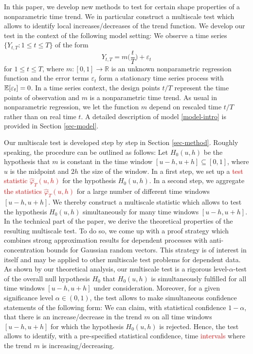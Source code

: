In this paper, we develop new methods to test for certain shape properties of a nonparametric time trend. We in particular construct a multiscale test which allows to identify local increases/decreases of the trend function. 
We develop our test in the context of the following model setting: We observe a time series $\{ Y_{t,T}: 1 \le t \le T \}$ of the form 
\begin{equation}\label{model-intro}
Y_{t,T} = m \Big( \frac{t}{T} \Big) + \varepsilon_t
\end{equation}
for $1 \le t \le T$, where $m: [0,1] \rightarrow \mathbb{R}$ is an unknown nonparametric regression function and the error terms $\varepsilon_t$ form a stationary time series process with $\mathbb{E}[\varepsilon_t] = 0$. In a time series context, the design points $t/T$ represent the time points of observation and $m$ is a nonparametric time trend. As usual in nonparametric regression, we let the function $m$ depend on rescaled time $t/T$ rather than on real time $t$. A detailed description of model \eqref{model-intro} is provided in Section \ref{sec-model}.


Our multiscale test is developed step by step in Section \ref{sec-method}. Roughly speaking, the procedure can be outlined as follows: Let $H_0(u,h)$ be the hypothesis that $m$ is constant in the time window $[u-h,u+h] \subseteq [0,1]$, where $u$ is the midpoint and $2h$ the size of the window. In a first step, we set up a \textcolor{red}{test statistic $\widehat{\varphi}_T(u,h)$} for the hypothesis $H_0(u,h)$. In a second step, we aggregate \textcolor{red}{the statistics $\widehat{\varphi}_T(u,h)$} for a large number of different time windows $[u-h,u+h]$. We thereby construct a multiscale statistic which allows to test the hypothesis $H_0(u,h)$ simultaneously for many time windows $[u-h,u+h]$. In the technical part of the paper, we derive the theoretical properties of the resulting multiscale test. To do so, we come up with a proof strategy which combines strong approximation results for dependent processes with anti-concentration bounds for Gaussian random vectors. This strategy is of interest in itself and may be applied to other multiscale test problems for dependent data. As shown by our theoretical analysis, our multiscale test is a rigorous level-$\alpha$-test of the overall null hypothesis $H_0$ that $H_0(u,h)$ is simultaneously fulfilled for all time windows $[u-h,u+h]$ under consideration. Moreover, for a given significance level $\alpha \in (0,1)$, the test allows to make simultaneous confidence statements of the following form: We can claim, with statistical confidence $1-\alpha$, that there is an increase/decrease in the trend $m$ on all time windows $[u-h,u+h]$ for which the hypothesis $H_0(u,h)$ is rejected. Hence, the test allows to identify, with a pre-specified statistical confidence, time \textcolor{red}{intervals} where the trend $m$ is increasing/decreasing. 


